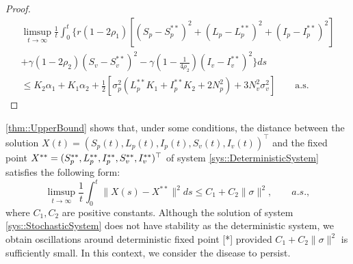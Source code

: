 \begin{proof}
	\begin{multline*}
	 	\limsup
	 	\limits_{t \to 	\infty}
	 	\frac{1}{t}
	 	\int_{0}^{t}
	 		\{
	 			r
	 			\left(
	 				1 - 2 \rho_1
	 			\right)
	 			\left[
	 				(S_p - S_p ^{**}) ^ 2 + 
	 				(L_p - L_p ^{**}) ^ 2 +
	 				(I_p - I_p ^{**}) ^ 2
	 			\right]
	 	\\
	 	+
	 		\gamma
	 		\left(
	 			1 - 2 \rho_2
	 		\right)
	 		(S_v - S_v^{**}) ^ 2 - 
	 		\gamma
	 		\left( 1 - 
	 			\frac{1}{4\rho_2}
	 		\right)(I_v-I_v^{**})^2\}
	 		ds
	 	\\
	 	\leq
	 		K_2
	 		\alpha_1 + 
	 		K_1 \alpha_2 + 
	 		\frac{1}{2}
	 		\left[
	 			\sigma_p^2(
	 				L_p ^{**} K_1 + 
	 				I_p ^{**} K_2 + 
	 				2N_p^2
	 			) + 
	 			3 N_v ^ 2
	 			\sigma_v ^ 2
	 		\right]
	 	\qquad 
	 	\mbox{a.s.}
 	\end{multline*}
 \end{proof}
\begin{remark}
\autoref{thm::UpperBound} shows that, under some conditions, the distance between the solution 
 	$
 		X(t)=(S_p(t),L_p(t),I_p(t),S_v(t),I_v(t))^\top
 	$ 
 	and the fixed point 
 	$
 		X^{**}=(S_p^{**},L_p^{**},\\I_p^{**},S_v^{**},I_v^{**})^\top
 	$ of system \autoref{sys::DeterministicSystem} satisfies the following form:
 	\begin{equation*}
  		\limsup_{t\to\infty}
  		\frac{1}{t}
  		\int_{0} ^ {t}
  			\|X(s) - X ^{**}\| ^ 2 
  		ds
  		\leq 
  		C_1 + C_2
  		\|\sigma\| ^ 2,
  		\qquad a.s.,
 	\end{equation*}
 	where $C_1, C_2$ are positive constants. Although the solution of system 
 	\autoref{sys::StochasticSystem} does not have stability as the deterministic system, we 
 	obtain oscillations around deterministic fixed point
 	[*] provided 
 	$
 		C_1 + C_2 
 		\|\sigma\|^2
 	$ is sufficiently small. In this context, we 
 	consider the disease to persist.
\end{remark}
